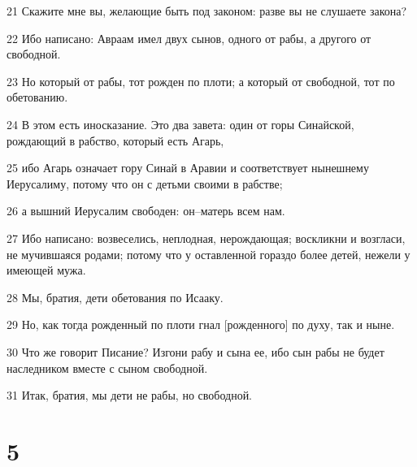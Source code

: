 \par 21 Скажите мне вы, желающие быть под законом: разве вы не слушаете закона?
\par 22 Ибо написано: Авраам имел двух сынов, одного от рабы, а другого от свободной.
\par 23 Но который от рабы, тот рожден по плоти; а который от свободной, тот по обетованию.
\par 24 В этом есть иносказание. Это два завета: один от горы Синайской, рождающий в рабство, который есть Агарь,
\par 25 ибо Агарь означает гору Синай в Аравии и соответствует нынешнему Иерусалиму, потому что он с детьми своими в рабстве;
\par 26 а вышний Иерусалим свободен: он--матерь всем нам.
\par 27 Ибо написано: возвеселись, неплодная, нерождающая; воскликни и возгласи, не мучившаяся родами; потому что у оставленной гораздо более детей, нежели у имеющей мужа.
\par 28 Мы, братия, дети обетования по Исааку.
\par 29 Но, как тогда рожденный по плоти гнал [рожденного] по духу, так и ныне.
\par 30 Что же говорит Писание? Изгони рабу и сына ее, ибо сын рабы не будет наследником вместе с сыном свободной.
\par 31 Итак, братия, мы дети не рабы, но свободной.

\chapter{5}

